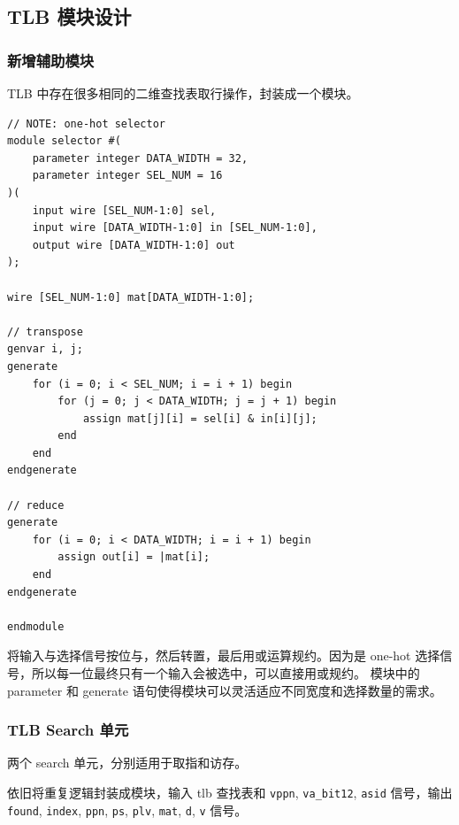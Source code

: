 \subsection{TLB 模块设计}

\subsubsection{新增辅助模块}

TLB 中存在很多相同的二维查找表取行操作，封装成一个模块。

\begin{lstlisting}
// NOTE: one-hot selector
module selector #(
    parameter integer DATA_WIDTH = 32,
    parameter integer SEL_NUM = 16
)(
    input wire [SEL_NUM-1:0] sel,
    input wire [DATA_WIDTH-1:0] in [SEL_NUM-1:0],
    output wire [DATA_WIDTH-1:0] out
);

wire [SEL_NUM-1:0] mat[DATA_WIDTH-1:0];

// transpose
genvar i, j;
generate
    for (i = 0; i < SEL_NUM; i = i + 1) begin
        for (j = 0; j < DATA_WIDTH; j = j + 1) begin
            assign mat[j][i] = sel[i] & in[i][j];
        end
    end
endgenerate

// reduce
generate
    for (i = 0; i < DATA_WIDTH; i = i + 1) begin
        assign out[i] = |mat[i];
    end
endgenerate

endmodule
\end{lstlisting}

将输入与选择信号按位与，然后转置，最后用或运算规约。因为是 one-hot 选择信号，所以每一位最终只有一个输入会被选中，可以直接用或规约。
模块中的 parameter 和 generate 语句使得模块可以灵活适应不同宽度和选择数量的需求。

\subsubsection{TLB Search 单元}

两个 search 单元，分别适用于取指和访存。

依旧将重复逻辑封装成模块，输入 tlb 查找表和 \verb|vppn|, \verb|va_bit12|, \verb|asid| 信号，输出 \verb|found|, \verb|index|, \verb|ppn|, \verb|ps|, \verb|plv|, \verb|mat|, \verb|d|, \verb|v| 信号。

